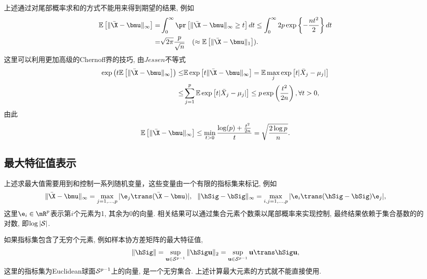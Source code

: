 \begin{exm}
    上述通过对尾部概率求和的方式不能用来得到期望的结果, 例如
    \begin{align*}
      \E \left[ \|\bar{\X}-\bmu\|_\infty \right]=&\int_0^\infty \pr\left[\|\bar{\X}-\bmu\|_\infty \geq t  \right] dt \leq  \int_0^\infty 2p \exp \left\{-\frac{n t^2}{2 }\right\} dt\\
      =& \sqrt{2 \pi} \frac{p}{\sqrt{n}}~~~(\approx  \E \left[ \|\bar{\X}-\bmu\|_1 \right]).
    \end{align*}  
   这里可以利用更加高级的Chernoff界的技巧, 由$Jessen$不等式
   \begin{align*}
      \exp\left( t \E \left[ \|\bar{\X}-\bmu\|_\infty \right]  \right)\leq & \E \exp \left[ t \|\bar{\X}-\bmu\|_\infty   \right]=\E  \max_{j} \exp \left[ t |\bar{X}_j-\mu_j|  \right]\\
      \leq & \sum_{j=1}^p \E \exp \left[ t |\bar{X}_j-\mu_j|   \right]\leq p \exp\left(\frac{t^2}{2n} \right), \forall t>0,
   \end{align*}
   由此
   \begin{align*}
      \E \left[ \|\bar{\X}-\bmu\|_\infty \right] \leq \min_{t>0} \frac{\log(p)+\frac{t^2}{2n}}{t}=\sqrt{\frac{2\log p}{n}}.
   \end{align*}
  \end{exm}

\subsection{最大特征值表示}
上述求最大值需要用到和控制一系列随机变量，这些变量由一个有限的指标集来标记, 例如
\begin{align*}
    \|\bar{\X}-\bmu\|_\infty=\max_{j=1,\ldots,p} |\e_j \trans (\bar{\X}-\bmu)|,~~\|\hSig-\bSig\|_\infty=\max_{i,j=1,\ldots,p} |\e_i \trans (\hSig-\bSig)\e_j|,
\end{align*}
这里$\e_i \in \mR^p$表示第$i$个元素为1, 其余为0的向量. 相关结果可以通过集合元素个数乘以尾部概率来实现控制, 最终结果依赖于集合基数的的对数, 即$\log |\mathcal{S}|$.


如果指标集包含了无穷个元素, 例如样本协方差矩阵的最大特征值, 
\begin{align*}
    \|\hSig\|=\sup_{\u \in \mS^{p-1}} \|\hSig \u\|_2=\sup_{\u \in \mS^{p-1}} \u \trans \hSig \u,
\end{align*}
这里的指标集为Euclidean球面$\mathcal{S}^{p-1}$上的向量, 是一个无穷集合. 上述计算最大元素的方式就不能直接使用. 



